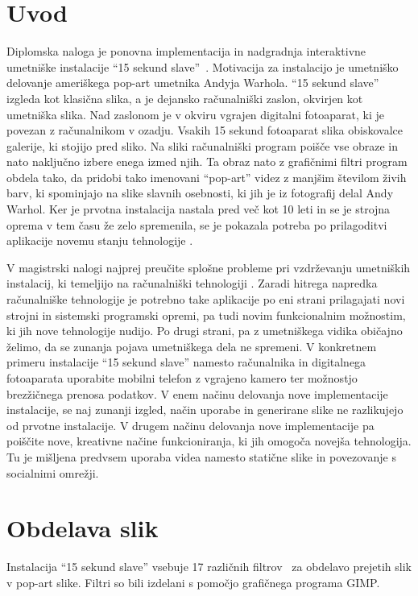 \chapter{Uvod}
Diplomska naloga je ponovna implementacija in nadgradnja interaktivne umetniške instalacije ``15 sekund slave''~\cite{15secLeonardo}. Motivacija za instalacijo je umetniško delovanje ameriškega pop-art umetnika Andyja Warhola. ``15 sekund slave'' izgleda kot klasična slika, a je dejansko računalniški zaslon, okvirjen kot umetniška slika. Nad zaslonom je v okviru vgrajen digitalni fotoaparat, ki je povezan z računalnikom v ozadju. Vsakih 15 sekund fotoaparat slika obiskovalce galerije, ki stojijo pred sliko. Na sliki računalniški program poišče vse obraze in nato naključno izbere enega izmed njih. Ta obraz nato z grafičnimi filtri program obdela tako, da pridobi tako imenovani ``pop-art'' videz z manjšim številom živih barv, ki spominjajo na slike slavnih osebnosti, ki jih je iz fotografij delal Andy Warhol. Ker je prvotna instalacija nastala pred več kot 10 leti in se je strojna oprema v tem času že zelo spremenila, se je pokazala potreba po prilagoditvi aplikacije novemu stanju tehnologije \cite{trifonova}.

V magistrski nalogi najprej preučite splošne probleme pri vzdrževanju umetniških instalacij, ki temeljijo na računalniški tehnologiji \cite{miller1,miller2,digitalartconservation}. Zaradi hitrega napredka računalniške tehnologije je potrebno take aplikacije po eni strani prilagajati novi strojni in sistemski programski opremi, pa tudi novim funkcionalnim možnostim, ki jih nove tehnologije nudijo. Po drugi strani, pa z umetniškega vidika običajno želimo, da se zunanja pojava umetniškega dela ne spremeni. V konkretnem primeru instalacije ``15 sekund slave'' namesto računalnika in digitalnega fotoaparata uporabite mobilni telefon z vgrajeno kamero ter možnostjo brezžičnega prenosa podatkov. V enem načinu delovanja nove implementacije instalacije, se naj zunanji izgled, način uporabe in generirane slike ne razlikujejo od prvotne instalacije. V drugem načinu delovanja nove implementacije pa poiščite nove, kreativne načine funkcioniranja, ki jih omogoča novejša tehnologija. Tu je mišljena predvsem uporaba videa namesto statične slike in povezovanje s socialnimi omrežji.




\chapter{Obdelava slik}
Instalacija ``15 sekund slave'' vsebuje 17 različnih filtrov~\cite[Poglavje~5]{diplomskaSamoJuvan} za obdelavo prejetih slik v pop-art slike. Filtri so bili izdelani s pomočjo grafičnega programa GIMP.


